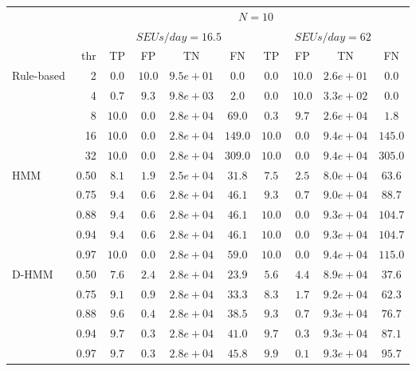 \begin{tabular}{l r c c c c c c c c }
\toprule
 & & \multicolumn{8}{c}{$N = 10$}  \\
 \cmidrule(lr){3-10}
 &  & \multicolumn{4}{c}{$SEUs/day = 16.5$} & \multicolumn{4}{c}{$SEUs/day = 62$} \\
 \cmidrule(lr){3-6} \cmidrule(lr){7-10}
  & thr & TP & FP & TN & FN & TP & FP & TN & FN \\
 \cmidrule(lr){2-2} \cmidrule(lr){3-3} \cmidrule(lr){4-4} \cmidrule(lr){5-5} \cmidrule(lr){6-6} \cmidrule(lr){7-7} \cmidrule(lr){8-8} \cmidrule(lr){9-9} \cmidrule(lr){10-10}


 \multirow{5}{*}{Rule-based} & 2 & $0.0$ & $10.0$ & $9.5e+01$ & $0.0$ & $0.0$ & $10.0$ & $2.6e+01$ & $0.0$\\
 & 4 & $0.7$ & $9.3$ & $9.8e+03$ & $2.0$ & $0.0$ & $10.0$ & $3.3e+02$ & $0.0$\\
 & 8 & $10.0$ & $0.0$ & $2.8e+04$ & $69.0$ & $0.3$ & $9.7$ & $2.6e+04$ & $1.8$\\
 & 16 & $10.0$ & $0.0$ & $2.8e+04$ & $149.0$ & $10.0$ & $0.0$ & $9.4e+04$ & $145.0$\\
 & 32 & $10.0$ & $0.0$ & $2.8e+04$ & $309.0$ & $10.0$ & $0.0$ & $9.4e+04$ & $305.0$\\
\cmidrule(lr){1-2}
 \multirow{5}{*}{HMM} & 0.50 & $8.1$ & $1.9$ & $2.5e+04$ & $31.8$ & $7.5$ & $2.5$ & $8.0e+04$ & $63.6$\\
 & 0.75 & $9.4$ & $0.6$ & $2.8e+04$ & $46.1$ & $9.3$ & $0.7$ & $9.0e+04$ & $88.7$\\
 & 0.88 & $9.4$ & $0.6$ & $2.8e+04$ & $46.1$ & $10.0$ & $0.0$ & $9.3e+04$ & $104.7$\\
 & 0.94 & $9.4$ & $0.6$ & $2.8e+04$ & $46.1$ & $10.0$ & $0.0$ & $9.3e+04$ & $104.7$\\
 & 0.97 & $10.0$ & $0.0$ & $2.8e+04$ & $59.0$ & $10.0$ & $0.0$ & $9.4e+04$ & $115.0$\\
\cmidrule(lr){1-2}
 \multirow{5}{*}{D-HMM} & 0.50 & $7.6$ & $2.4$ & $2.8e+04$ & $23.9$ & $5.6$ & $4.4$ & $8.9e+04$ & $37.6$\\
 & 0.75 & $9.1$ & $0.9$ & $2.8e+04$ & $33.3$ & $8.3$ & $1.7$ & $9.2e+04$ & $62.3$\\
 & 0.88 & $9.6$ & $0.4$ & $2.8e+04$ & $38.5$ & $9.3$ & $0.7$ & $9.3e+04$ & $76.7$\\
 & 0.94 & $9.7$ & $0.3$ & $2.8e+04$ & $41.0$ & $9.7$ & $0.3$ & $9.3e+04$ & $87.1$\\
 & 0.97 & $9.7$ & $0.3$ & $2.8e+04$ & $45.8$ & $9.9$ & $0.1$ & $9.3e+04$ & $95.7$\\






\bottomrule
\end{tabular}